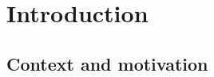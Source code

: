 
%
%


\chapter{Introduction}
\label{ch:intro}


\section{Context and motivation}
\label{sec:intro:context}


